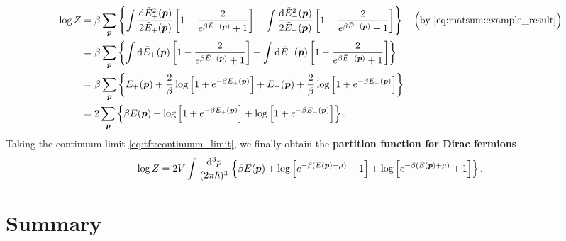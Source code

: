 \begin{equation}
\begin{split}
	\log Z &= \beta \sum_{\bm{p}} \left\{ \int \frac{\mathop{}\!\mathrm{d} \tilde E_+^2({\bm{p}})}{2 \tilde E_+({\bm{p}})} \left[ 1 - \frac{2}{e^{\beta \tilde E_+({\bm{p}})} + 1} \right] +
	                                     \int \frac{\mathop{}\!\mathrm{d} \tilde E_-^2({\bm{p}})}{2 \tilde E_-({\bm{p}})} \left[ 1 - \frac{2}{e^{\beta \tilde E_-({\bm{p}})} + 1} \right] \right\} \quad \Big( \text{by \eqref{eq:matsum:example_result}} \Big) \\
	       &= \beta \sum_{\bm{p}} \left\{ \int \mathop{}\!\mathrm{d} \tilde E_+({\bm{p}}) \left[ 1 - \frac{2}{e^{\beta \tilde E_+({\bm{p}})} + 1} \right] +
	                                     \int \mathop{}\!\mathrm{d} \tilde E_-({\bm{p}}) \left[ 1 - \frac{2}{e^{\beta \tilde E_-({\bm{p}})} + 1} \right] \right\} \\
	       &= \beta \sum_{\bm{p}} \left\{ E_+({\bm{p}}) + \frac{2}{\beta} \log \left[ 1 + e^{-\beta E_+({\bm{p}})} \right] +
	                                     E_-({\bm{p}}) + \frac{2}{\beta} \log \left[ 1 + e^{-\beta E_-({\bm{p}})} \right] \right\} \\
	       &= 2     \sum_{\bm{p}} \left\{ \beta E({\bm{p}}) + \log \left[ 1 + e^{-\beta E_+({\bm{p}})} \right] + \log \left[ 1 + e^{-\beta E_-({\bm{p}})} \right] \right\} . \\
\end{split}
\end{equation}
Taking the continuum limit \eqref{eq:tft:continuum_limit}, we finally obtain the \textbf{partition function for Dirac fermions}
\begin{equation}
	\log Z = 2 V \int \frac{\mathop{}\!\mathrm{d}^3 p}{(2 \pi \hbar)^3} \left\{ \beta E({\bm{p}}) + \log \left[ e^{-\beta (E({\bm{p}}) - \mu)}+1 \right] + \log \left[ e^{-\beta (E({\bm{p}}) + \mu)} + 1\right] \right\} .
\label{eq:tft:dirac_partition_function}
\end{equation}

\section{Summary}

